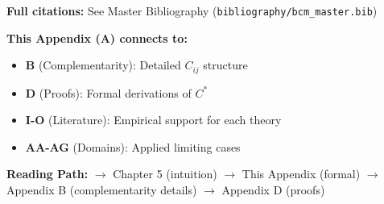 \textbf{Full citations:} See Master Bibliography (\texttt{bibliography/bcm\_master.bib})


\begin{tcolorbox}[colback=gray!10!white, colframe=gray!75!black,
    title=\textbf{Cross-Reference Footer}]
\label{sec:A-footer}

\textbf{This Appendix (A) connects to:}
\begin{itemize}[nosep]
    \item \textbf{B} (Complementarity): Detailed $C_{ij}$ structure
    \item \textbf{D} (Proofs): Formal derivations of $C^*$
    \item \textbf{I-O} (Literature): Empirical support for each theory
    \item \textbf{AA-AG} (Domains): Applied limiting cases
\end{itemize}

\textbf{Reading Path:}
$\rightarrow$ Chapter 5 (intuition) $\rightarrow$ This Appendix (formal)
$\rightarrow$ Appendix B (complementarity details) $\rightarrow$ Appendix D (proofs)

\end{tcolorbox}
